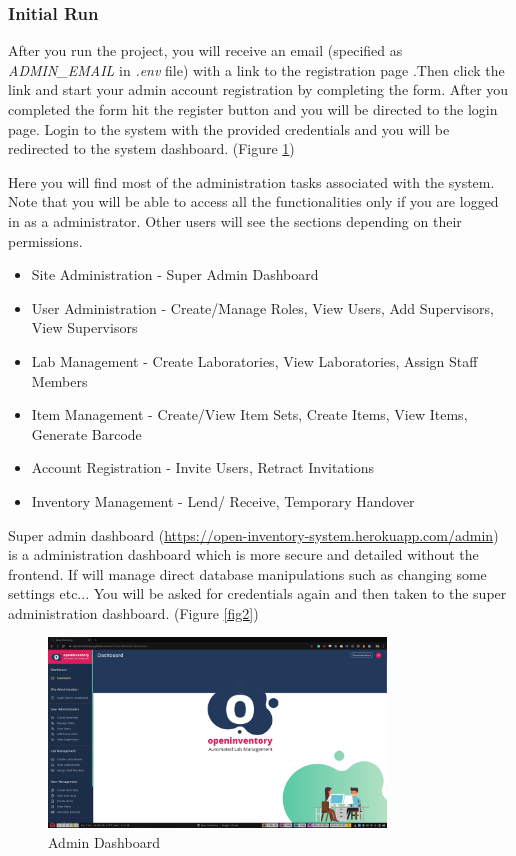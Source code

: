 \documentclass[12pt,a4paper]{article}
\begin{document}
\subsubsection{Initial Run}

After you run the project, you will receive an email (specified as \textit{ADMIN\_EMAIL} in \textit{.env} file) with a link to the registration page .Then click the link and start your admin account registration by completing the form. After you completed the form hit the register button and you will be directed to the login page. Login to the system with the provided credentials and you will be redirected to the system dashboard. (Figure \ref{fig1})

Here you will find most of the administration tasks associated with the system. Note that you will be able to access all the functionalities only if you are logged in as a administrator. Other users will see the sections depending on their permissions.
\begin{itemize}[noitemsep]
    \item Site Administration - Super Admin Dashboard
    \item  User Administration - Create/Manage Roles, View Users, Add Supervisors, View Supervisors
    \item Lab Management - Create Laboratories, View Laboratories, Assign Staff Members
    \item Item Management - Create/View Item Sets, Create Items, View Items, Generate Barcode
    \item Account Registration - Invite Users, Retract Invitations
    \item Inventory Management - Lend/ Receive, Temporary Handover
\end{itemize}\par

Super admin dashboard (\url{https://open-inventory-system.herokuapp.com/admin}) is a administration dashboard which is more secure and detailed without the frontend. If will manage direct database manipulations such as changing some settings etc... You will be asked for credentials again and then taken to the super administration dashboard. (Figure \ref{fig2})

\begin{figure}[ht]
    \centering
    \includegraphics[width=0.8\textwidth]{./images/1.png}
    \caption{Admin Dashboard}
    \label{fig1}
\end{figure}
\end{document}
